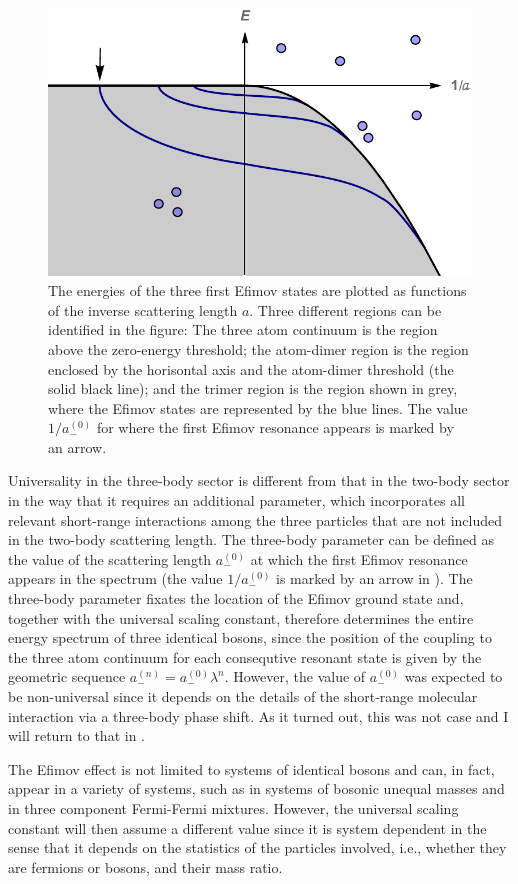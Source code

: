 \begin{figure}
	\centering
	\includegraphics[width=0.75\linewidth]{efimov_spec_a}
	\caption{The energies of the three first Efimov states are plotted as functions of the inverse scattering length $a$. Three different regions can be identified in the figure: The three atom continuum is the region above the zero-energy threshold; the atom-dimer region is the region enclosed by the horisontal axis and the atom-dimer threshold (the solid black line); and the trimer region is the region shown in grey, where the Efimov states are represented by the blue lines. The value $1/a_-^{(0)}$ for where the first Efimov resonance appears is marked by an arrow.}\label{fig:efimov}
\end{figure} 

Universality in the three-body sector is different from that in the two-body sector in the way that it requires an additional parameter, which incorporates all relevant short-range interactions among the three particles that are not included in the two-body scattering length. The three-body parameter can be defined as the value of the scattering length $a_-^{(0)}$ at which the first Efimov resonance appears in the spectrum (the value $1/a_-^{(0)}$ is marked by an arrow in ). The three-body parameter fixates the location of the Efimov ground state and, together with the universal scaling constant, therefore determines the entire energy spectrum of three identical bosons, since the position of the coupling to the three atom continuum for each consequtive resonant state is given by the geometric sequence $a_-^{(n)}=a_-^{(0)}\lambda^n$. However, the value of $a_-^{(0)}$ was expected to be non-universal since it depends on the details of the short-range molecular interaction via a three-body phase shift. As it turned out, this was not case and I will return to that in .

The Efimov effect is not limited to systems of identical bosons and can, in fact, appear in a variety of systems, such as in systems of bosonic unequal masses and in three component Fermi-Fermi mixtures. However, the universal scaling constant will then assume a different value since it is system dependent in the sense that it depends on the statistics of the particles involved, i.e., whether they are fermions or bosons, and their mass ratio. 

